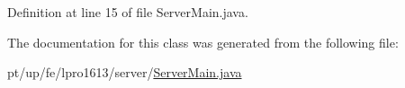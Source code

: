 Definition at line 15 of file Server\+Main.\+java.



The documentation for this class was generated from the following file\+:\begin{DoxyCompactItemize}
\item 
pt/up/fe/lpro1613/server/\hyperlink{_server_main_8java}{Server\+Main.\+java}\end{DoxyCompactItemize}
